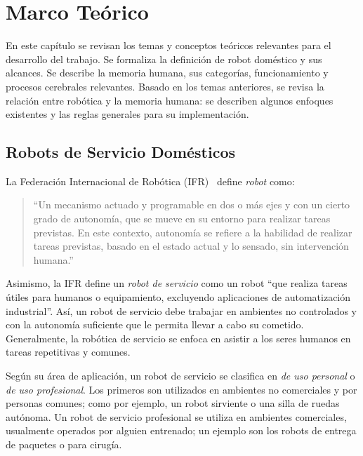 \chapter{Marco Teórico}\label{chapter:theory}

En este capítulo se revisan los temas y conceptos teóricos relevantes para el desarrollo del trabajo. Se formaliza la definición de robot doméstico y sus alcances. Se describe la memoria humana, sus categorías, funcionamiento y procesos cerebrales relevantes. Basado en los temas anteriores, se revisa la relación entre robótica y la memoria humana: se describen algunos enfoques existentes y las reglas generales para su implementación.

\section{Robots de Servicio Domésticos}\label{sec:domestic_robots}

La Federación Internacional de Robótica (IFR)~\cite{IFR} define \textit{robot} como:
\begin{quotation}
	``Un mecanismo actuado y programable en dos o más ejes y con un cierto grado de autonomía, que se mueve en su entorno para realizar tareas previstas. En este contexto, autonomía se refiere a la habilidad de realizar tareas previstas, basado en el estado actual y lo sensado, sin intervención humana.''
\end{quotation}

Asimismo, la IFR define un \textit{robot de servicio} como un robot ``que realiza tareas útiles para humanos o equipamiento, excluyendo aplicaciones de automatización industrial''. Así, un robot de servicio debe trabajar en ambientes no controlados y con la autonomía suficiente que le permita llevar a cabo su cometido. Generalmente, la robótica de servicio se enfoca en asistir a los seres humanos en tareas repetitivas y comunes.

Según su área de aplicación, un robot de servicio se clasifica en \textit{de uso personal} o \textit{de uso profesional}. Los primeros son utilizados en ambientes no comerciales y por personas comunes; como por ejemplo, un robot sirviente o una silla de ruedas autónoma. Un robot de servicio profesional se utiliza en ambientes comerciales, usualmente operados por alguien entrenado; un ejemplo son los robots de entrega de paquetes o para cirugía.


